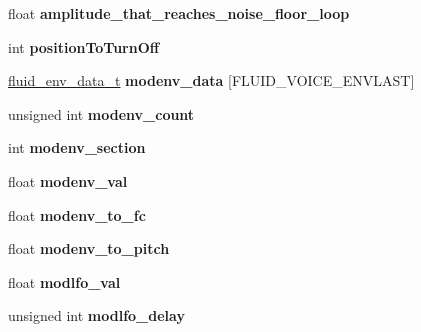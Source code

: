\begin{DoxyCompactItemize}
\item 
\mbox{\label{class_fluid_s_1_1_voice_a404cd546d9352fabf689445ff1aebad6}} 
float {\bfseries amplitude\+\_\+that\+\_\+reaches\+\_\+noise\+\_\+floor\+\_\+loop}
\item 
\mbox{\label{class_fluid_s_1_1_voice_a792ff6cf9ab170c962b3a31f17809e95}} 
int {\bfseries position\+To\+Turn\+Off}
\item 
\mbox{\label{class_fluid_s_1_1_voice_a5a82ddac12a3ef4480024e3008227a6d}} 
\hyperlink{struct_fluid_s_1_1fluid__env__data__t}{fluid\+\_\+env\+\_\+data\+\_\+t} {\bfseries modenv\+\_\+data} \mbox{[}F\+L\+U\+I\+D\+\_\+\+V\+O\+I\+C\+E\+\_\+\+E\+N\+V\+L\+A\+ST\mbox{]}
\item 
\mbox{\label{class_fluid_s_1_1_voice_abb42e181795b06a4e07de6a372fc0d7f}} 
unsigned int {\bfseries modenv\+\_\+count}
\item 
\mbox{\label{class_fluid_s_1_1_voice_abf60af48e3bdaa1c758159e236d5b585}} 
int {\bfseries modenv\+\_\+section}
\item 
\mbox{\label{class_fluid_s_1_1_voice_aa9c19edf11212ac0177f5fd0c6ebc982}} 
float {\bfseries modenv\+\_\+val}
\item 
\mbox{\label{class_fluid_s_1_1_voice_a746ef2f83c41df91c83faed1e3ebdcb4}} 
float {\bfseries modenv\+\_\+to\+\_\+fc}
\item 
\mbox{\label{class_fluid_s_1_1_voice_abf1f4cf617763e64a29ffb68c1b607fe}} 
float {\bfseries modenv\+\_\+to\+\_\+pitch}
\item 
\mbox{\label{class_fluid_s_1_1_voice_ab33f6ade868929817bdaa94e7c27400f}} 
float {\bfseries modlfo\+\_\+val}
\item 
\mbox{\label{class_fluid_s_1_1_voice_a9ac9773526aae1e8f54c3b5e3d7a7f55}} 
unsigned int {\bfseries modlfo\+\_\+delay}
\item 
\mbox{\label{class_fluid_s_1_1_voice_aa0a37a2436f63e3606c0ce5b05b62c2b}} 

\end{DoxyCompactItemize}
